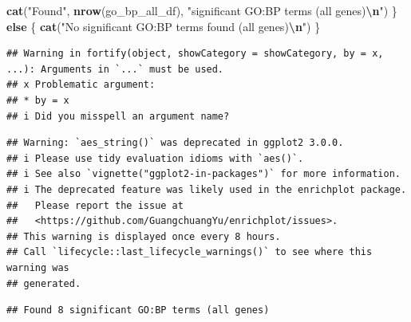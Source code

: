 \documentclass[
]{article}
\newenvironment{Shaded}{\begin{snugshade}}{\end{snugshade}}
\newcommand{\ControlFlowTok}[1]{\textcolor[rgb]{0.13,0.29,0.53}{\textbf{#1}}}
\newcommand{\FunctionTok}[1]{\textcolor[rgb]{0.13,0.29,0.53}{\textbf{#1}}}
\newcommand{\NormalTok}[1]{#1}
\newcommand{\SpecialCharTok}[1]{\textcolor[rgb]{0.81,0.36,0.00}{\textbf{#1}}}
\newcommand{\StringTok}[1]{\textcolor[rgb]{0.31,0.60,0.02}{#1}}
\begin{document}
\begin{Shaded}
\begin{Highlighting}[]
  \FunctionTok{cat}\NormalTok{(}\StringTok{"Found"}\NormalTok{, }\FunctionTok{nrow}\NormalTok{(go\_bp\_all\_df), }\StringTok{"significant GO:BP terms (all genes)}\SpecialCharTok{\textbackslash{}n}\StringTok{"}\NormalTok{)}
\NormalTok{\} }\ControlFlowTok{else}\NormalTok{ \{}
  \FunctionTok{cat}\NormalTok{(}\StringTok{"No significant GO:BP terms found (all genes)}\SpecialCharTok{\textbackslash{}n}\StringTok{"}\NormalTok{)}
\NormalTok{\}}
\end{Highlighting}
\end{Shaded}

\begin{verbatim}
## Warning in fortify(object, showCategory = showCategory, by = x, ...): Arguments in `...` must be used.
## x Problematic argument:
## * by = x
## i Did you misspell an argument name?
\end{verbatim}

\begin{verbatim}
## Warning: `aes_string()` was deprecated in ggplot2 3.0.0.
## i Please use tidy evaluation idioms with `aes()`.
## i See also `vignette("ggplot2-in-packages")` for more information.
## i The deprecated feature was likely used in the enrichplot package.
##   Please report the issue at
##   <https://github.com/GuangchuangYu/enrichplot/issues>.
## This warning is displayed once every 8 hours.
## Call `lifecycle::last_lifecycle_warnings()` to see where this warning was
## generated.
\end{verbatim}

\begin{verbatim}
## Found 8 significant GO:BP terms (all genes)
\end{verbatim}
\end{document}

